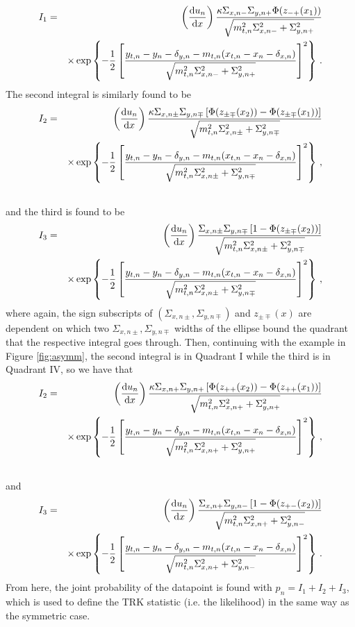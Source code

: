 \begin{eqnarray}
I_1& = & \left(\dv{u_n}{x}\right)\frac{\kappa\Sigma_{x,n-}\Sigma_{y,n+}\Phi(z_{-+}(x_1))}{\sqrt{m_{t,n}^2\Sigma_{x,n-}^2+\Sigma_{y,n+}^2}} \nonumber \\
& &\times \exp\left\{-\frac{1}{2}\left[\frac{y_{t,n}-y_n-\delta_{y,n}-m_{t,n}(x_{t,n}-x_n-\delta_{x,n})}{\sqrt{m_{t,n}^2\Sigma_{x,n-}^2+\Sigma_{y,n+}^2}}\right]^2\right\} \, .
\end{eqnarray}
The second integral is similarly found to be
\begin{eqnarray}\label{eq:asymmint2}
I_{2} & = & \left(\dv{u_n}{x}\right)\frac{\kappa\Sigma_{x,n\pm}\Sigma_{y,n\mp}\left[\Phi(z_{\pm\mp}(x_2))-\Phi(z_{\pm\mp}(x_1))\right]}{\sqrt{m_{t,n}^2\Sigma_{x,n\pm}^2+\Sigma_{y,n\mp}^2}} \nonumber \\
& &\times \exp\left\{-\frac{1}{2}\left[\frac{y_{t,n}-y_n-\delta_{y,n}-m_{t,n}(x_{t,n}-x_n-\delta_{x,n})}{\sqrt{m_{t,n}^2\Sigma_{x,n\pm}^2+\Sigma_{y,n\mp}^2}}\right]^2\right\}\,, \nonumber \\
& &  \,
\end{eqnarray}
and the third is found to be
\begin{eqnarray}\label{eq:asymmint3}
I_{3} & = &  \left(\dv{u_n}{x}\right)\frac{\Sigma_{x,n\pm}\Sigma_{y,n\mp}\left[1-\Phi(z_{\pm\mp}(x_2))\right]}{\sqrt{m_{t,n}^2\Sigma_{x,n\pm}^2+\Sigma_{y,n\mp}^2}} \nonumber \\
& &\times \exp\left\{-\frac{1}{2}\left[\frac{y_{t,n}-y_n-\delta_{y,n}-m_{t,n}(x_{t,n}-x_n-\delta_{x,n})}{\sqrt{m_{t,n}^2\Sigma_{x,n\pm}^2+\Sigma_{y,n\mp}^2}}\right]^2\right\} \,,
\end{eqnarray}
where again, the sign subscripts of $(\Sigma_{x,n\pm}, \Sigma_{y,n\mp})$ and $z_{\pm\mp}(x)$ are dependent on which two $\Sigma_{x,n\pm}, \Sigma_{y,n\mp}$ widths of the ellipse bound the quadrant that the respective integral goes through. Then, continuing with the example in Figure \ref{fig:asymm}, the second integral is in Quadrant I while the third is in Quadrant IV, so we have that
\begin{eqnarray}
I_{2} & = & \left(\dv{u_n}{x}\right)\frac{\kappa\Sigma_{x,n+}\Sigma_{y,n+}\left[\Phi(z_{++}(x_2))-\Phi(z_{++}(x_1))\right]}{\sqrt{m_{t,n}^2\Sigma_{x,n+}^2+\Sigma_{y,n+}^2}} \nonumber \\
& &\times \exp\left\{-\frac{1}{2}\left[\frac{y_{t,n}-y_n-\delta_{y,n}-m_{t,n}(x_{t,n}-x_n-\delta_{x,n})}{\sqrt{m_{t,n}^2\Sigma_{x,n+}^2+\Sigma_{y,n+}^2}}\right]^2\right\}\,, \nonumber \\
& &  \,
\end{eqnarray}
and
\begin{eqnarray}
I_{3} & = &  \left(\dv{u_n}{x}\right)\frac{\Sigma_{x,n+}\Sigma_{y,n-}\left[1-\Phi(z_{+-}(x_2))\right]}{\sqrt{m_{t,n}^2\Sigma_{x,n+}^2+\Sigma_{y,n-}^2}} \nonumber \\
& &\times \exp\left\{-\frac{1}{2}\left[\frac{y_{t,n}-y_n-\delta_{y,n}-m_{t,n}(x_{t,n}-x_n-\delta_{x,n})}{\sqrt{m_{t,n}^2\Sigma_{x,n+}^2+\Sigma_{y,n-}^2}}\right]^2\right\} \,.
\end{eqnarray}
From here, the joint probability of the datapoint is found with $p_n=I_1+I_2+I_3$, which is used to define the TRK statistic (i.e. the likelihood) in the same way as the symmetric case.

